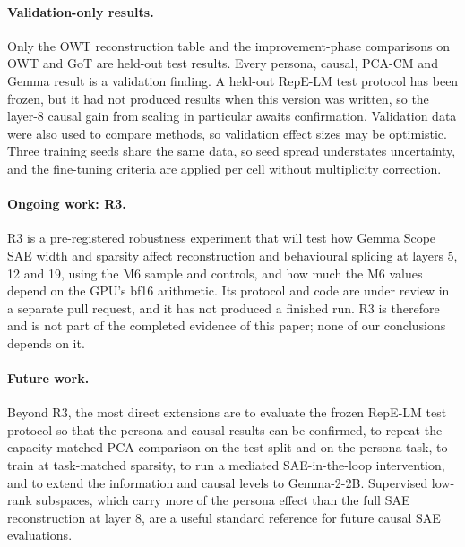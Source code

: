 \paragraph{Validation-only results.} Only the OWT reconstruction table and the improvement-phase comparisons on OWT
and GoT are held-out test results. Every persona, causal, PCA-CM and Gemma result is a validation finding. A held-out
RepE-LM test protocol has been frozen, but it had not produced results when this version was written, so the layer-8
causal gain from scaling in particular awaits confirmation. Validation data were also used to compare methods, so
validation effect sizes may be optimistic. Three training seeds share the same data, so seed spread understates
uncertainty, and the fine-tuning criteria are applied per cell without multiplicity correction.

\paragraph{Ongoing work: R3.} R3 is a pre-registered robustness experiment that will test how Gemma Scope SAE width and
sparsity affect reconstruction and behavioural splicing at layers 5, 12 and 19, using the M6 sample and controls, and
how much the M6 values depend on the GPU's bf16 arithmetic. Its protocol and code are under review in a separate pull
request, and it has not produced a finished run. R3 is therefore
 and is not part of the completed evidence of this paper; none of our conclusions depends
on it.

\paragraph{Future work.} Beyond R3, the most direct extensions are to evaluate the frozen RepE-LM test protocol so that
the persona and causal results can be confirmed, to repeat the capacity-matched PCA comparison on the test split and on
the persona task, to train at task-matched sparsity, to run a mediated SAE-in-the-loop intervention, and to extend the
information and causal levels to Gemma-2-2B. Supervised low-rank subspaces, which carry more of the persona effect than
the full SAE reconstruction at layer 8, are a useful standard reference for future causal SAE evaluations.
